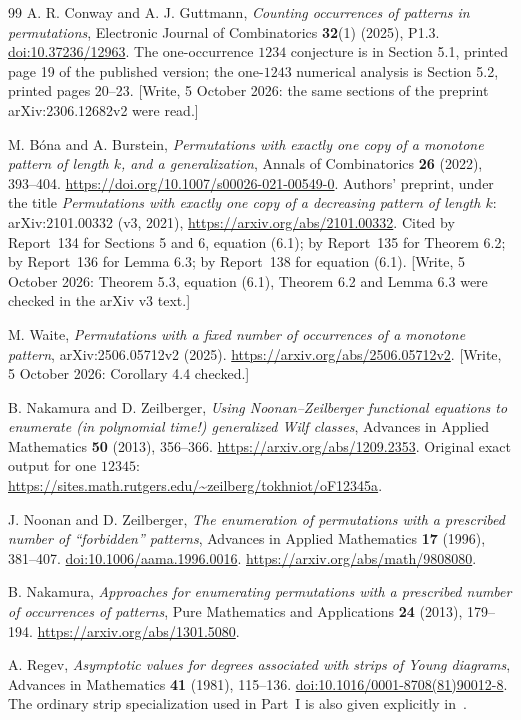 \documentclass[11pt,letterpaper]{article}
\theoremstyle{remark}\newtheorem{remark}[theorem]{Remark}
\numberwithin{equation}{section}
\begin{document}
\begin{thebibliography}{99}
A. R. Conway and A. J. Guttmann, \emph{Counting occurrences of patterns in permutations}, Electronic Journal of Combinatorics \textbf{32}(1) (2025), P1.3. \href{https://doi.org/10.37236/12963}{doi:10.37236/12963}. The one-occurrence $1234$ conjecture is in Section 5.1, printed page 19 of the published version; the one-$1243$ numerical analysis is Section 5.2, printed pages 20--23. [Write, 5 October 2026: the same sections of the preprint arXiv:2306.12682v2 were read.]

M. B\'ona and A. Burstein, \emph{Permutations with exactly one copy of a monotone pattern of length $k$, and a generalization}, Annals of Combinatorics \textbf{26} (2022), 393--404. \url{https://doi.org/10.1007/s00026-021-00549-0}. Authors' preprint, under the title \emph{Permutations with exactly one copy of a decreasing pattern of length $k$}: arXiv:2101.00332 (v3, 2021), \url{https://arxiv.org/abs/2101.00332}. Cited by Report~134 for Sections 5 and 6, equation (6.1); by Report~135 for Theorem 6.2; by Report~136 for Lemma 6.3; by Report~138 for equation (6.1). [Write, 5 October 2026: Theorem 5.3, equation (6.1), Theorem 6.2 and Lemma 6.3 were checked in the arXiv v3 text.]

M. Waite, \emph{Permutations with a fixed number of occurrences of a monotone pattern}, arXiv:2506.05712v2 (2025). \url{https://arxiv.org/abs/2506.05712v2}. [Write, 5 October 2026: Corollary 4.4 checked.]

B. Nakamura and D. Zeilberger, \emph{Using Noonan--Zeilberger functional equations to enumerate (in polynomial time!) generalized Wilf classes}, Advances in Applied Mathematics \textbf{50} (2013), 356--366. \url{https://arxiv.org/abs/1209.2353}. Original exact output for one $12345$: \url{https://sites.math.rutgers.edu/~zeilberg/tokhniot/oF12345a}.

J. Noonan and D. Zeilberger, \emph{The enumeration of permutations with a prescribed number of ``forbidden'' patterns}, Advances in Applied Mathematics \textbf{17} (1996), 381--407. \href{https://doi.org/10.1006/aama.1996.0016}{doi:10.1006/aama.1996.0016}. \url{https://arxiv.org/abs/math/9808080}.

B. Nakamura, \emph{Approaches for enumerating permutations with a prescribed number of occurrences of patterns}, Pure Mathematics and Applications \textbf{24} (2013), 179--194. \url{https://arxiv.org/abs/1301.5080}.

A. Regev, \emph{Asymptotic values for degrees associated with strips of Young diagrams}, Advances in Mathematics \textbf{41} (1981), 115--136. \href{https://doi.org/10.1016/0001-8708(81)90012-8}{doi:10.1016/0001-8708(81)90012-8}. The ordinary strip specialization used in Part~I is also given explicitly in~\cite{Regev2010}.


\end{thebibliography}
\end{document}

